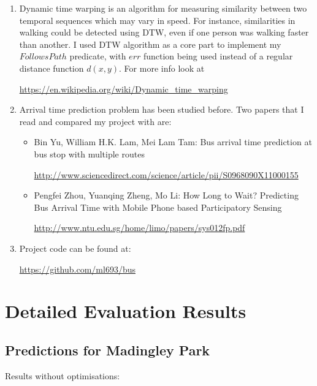 \documentclass[12pt,a4paper,oneside,openright]{report}
\begin{document}
\begin{enumerate}
\item Dynamic time warping is an algorithm for measuring similarity between
two temporal sequences which may vary in speed. For instance, similarities in
walking could be detected using DTW, even if one person was walking faster than
another. I used DTW algorithm as a core part to implement my $FollowsPath$
predicate, with $err$ function being used instead of a regular distance function 
$d(x, y)$.
For more info look at

\textcolor{blue}{\url{https://en.wikipedia.org/wiki/Dynamic_time_warping}}

\item Arrival time prediction problem has been studied before. Two papers that
I read and compared my project with are:

\begin{itemize}

\item Bin Yu, William H.K. Lam, Mei Lam Tam: Bus arrival time prediction at
bus stop with multiple routes 

\textcolor{blue}{\url{http://www.sciencedirect.com/science/article/pii/S0968090X11000155}}

\item Pengfei Zhou, Yuanqing Zheng, Mo Li: How Long to Wait? Predicting Bus Arrival Time with Mobile Phone based Participatory Sensing

\textcolor{blue}{\url{http://www.ntu.edu.sg/home/limo/papers/sys012fp.pdf}}

\end{itemize}

\item Project code can be found at: 

\textcolor{blue}{\url{https://github.com/ml693/bus}}


\end{enumerate}

\chapter{Detailed Evaluation Results}

\section{Predictions for Madingley Park}

Results without optimisations: \\
\end{document}
